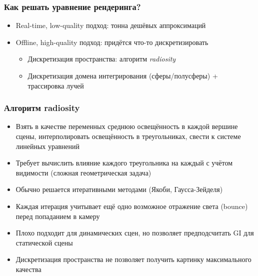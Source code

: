 \documentclass[handout,10pt]{beamer}
\begin{document}
\begin{frame}[fragile]
\frametitle{Как решать уравнение рендеринга?}
\begin{itemize}
\item Real-time, low-quality подход: тонна дешёвых аппроксимаций
\pause
\item Offline, high-quality подход: придётся что-то дискретизировать
\pause
\begin{itemize}
\item Дискретизация пространства: алгоритм \textit{radiosity}
\pause
\item Дискретизация домена интегрирования (сферы/полусферы) + трассировка лучей
\end{itemize}
\end{itemize}
\end{frame}

\begin{frame}[fragile]
\frametitle{Алгоритм radiosity}
\begin{itemize}
\item Взять в качестве переменных среднюю освещённость в каждой вершине сцены, интерполировать освещённость в треугольниках, свести к системе линейных уравнений
\pause
\item Требует вычислить влияние каждого треугольника на каждый с учётом видимости (сложная геометрическая задача)
\pause
\item Обычно решается итеративными методами (Якоби, Гаусса-Зейделя)
\pause
\item Каждая итерация учитывает ещё одно возможное отражение света (bounce) перед попаданием в камеру
\pause
\item Плохо подходит для динамических сцен, но позволяет предподсчитать GI для статической сцены
\pause 
\item Дискретизация пространства не позволяет получить картинку максимального качества
\end{itemize}
\end{frame}
\end{document}
